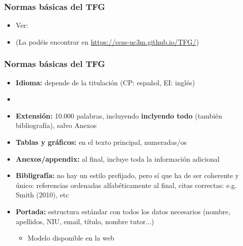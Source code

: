 \documentclass[aspectratio=43]{beamer}
\begin{document}
\begin{frame}
\frametitle{Normas básicas del TFG}
\centering

\begin{itemize}
  \item Ver: 
  \item[] (La podéis encontrar en \url{https://ccss-uc3m.github.io/TFG/})
\end{itemize}

\end{frame}

\begin{frame}
\frametitle{Normas básicas del TFG}
\centering

\begin{itemize}
  \item \textbf{Idioma:} depende de la titulación (CP: español, EI: inglés)
  \item[]
  \item \textbf{Extensión:} 10.000 palabras, incluyendo \textbf{inclyendo todo} (también bibliografía), salvo Anexos
  \item \textbf{Tablas y gráficos:} en el texto principal, numeradas/os
  \item \textbf{Anexos/appendix:} al final, incluye toda la información adicional
  \item \textbf{Bibligrafía:} no hay un estilo prefijado, pero sí que ha de ser coherente y único: referencias ordenadas alfabéticamente al final, citas correctas: e.g. Smith (2010), etc
  \item \textbf{Portada:} estructura estándar con todos los datos necesarios (nombre, apellidos, NIU, email, título, nombre tutor...)
  \begin{itemize}
    \item Modelo disponible en la web
  \end{itemize}
\end{itemize}

\end{frame}
\end{document}
